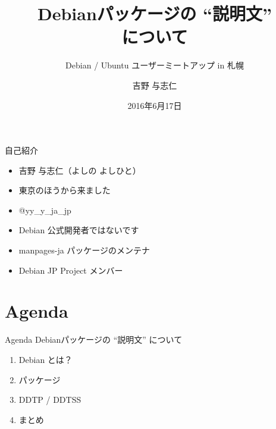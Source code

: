 \title{Debianパッケージの “説明文” \\について}
\subtitle{Debian / Ubuntu ユーザーミートアップ in 札幌}
\author{吉野 与志仁}
\date{2016年6月17日}



\frame{\titlepage{}}

\begin{frame}{自己紹介}

\begin{itemize}
 \item 吉野 与志仁（よしの よしひと）
 \item 東京のほうから来ました
 \item @yy\_y\_ja\_jp
 \item Debian 公式開発者ではないです
 \item manpages-ja パッケージのメンテナ
 \item Debian JP Project メンバー
\end{itemize} 
\end{frame}

\section{Agenda}
\begin{frame}{Agenda}
 Debianパッケージの “説明文” について
\begin{enumerate}
   \item Debian とは？
   \item パッケージ
   \item DDTP / DDTSS
   \item まとめ
\end{enumerate}
\end{frame}

